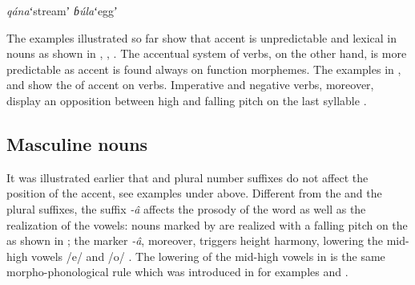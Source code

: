 \documentclass[output=paper,modfonts,nonflat,hidelinks]{langsci/langscibook}
\begin{document}
\begin{exe}
\ex \label{ex:Petrollino:qánabúla} \begin{xlist}
\ex \textit{qána}\hspace{15mm}ʻstreamʼ
\ex \textit{ɓúla}\hspace{16mm}ʻeggʼ
\end{xlist}
\end{exe}

The examples illustrated so far show that accent is unpredictable and lexical in nouns as shown in , , . The accentual system of  verbs, on the other hand, is more predictable as accent is found always on function morphemes. The examples in ,  and  show the  of accent on verbs. Imperative and negative verbs, moreover, display an opposition between high and falling pitch on the last syllable .  

\subsection{Masculine nouns} \label{sec:Petrollino:masculinenouns}

It was illustrated earlier that   and plural number suffixes do not affect the position of the accent, see examples under  above. Different from the  and the plural suffixes, the  suffix \textit{-â} affects the prosody of the word as well as the realization of the vowels: nouns marked by   are realized with a falling pitch on the  as shown in ; the   marker \textit{-â}, moreover, triggers height harmony, lowering the mid-high vowels /e/ and /o/ . The lowering of the mid-high vowels in  is the same morpho-phonological rule which was introduced in  for examples  and .
\end{document}
